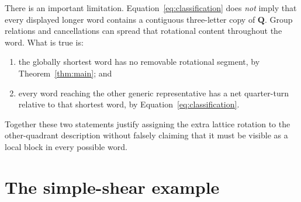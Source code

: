 \documentclass[11pt]{article}
\theoremstyle{definition}
\begin{document}
There is an important limitation.  Equation~\eqref{eq:classification} does
\emph{not} imply that every displayed longer word contains a contiguous
three-letter copy of \(\mathbf Q\).  Group relations and cancellations can
spread that rotational content throughout the word.  What is true is:
\begin{enumerate}
 \item the globally shortest word has no removable rotational segment, by
       Theorem~\ref{thm:main}; and
 \item every word reaching the other generic representative has a net
       quarter-turn relative to that shortest word, by
       Equation~\eqref{eq:classification}.
\end{enumerate}
Together these two statements justify assigning the extra lattice rotation
to the other-quadrant description without falsely claiming that it must be
visible as a local block in every possible word.

\section{The simple-shear example}
\end{document}
